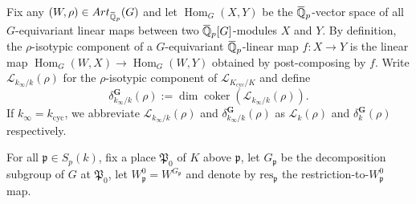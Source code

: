\documentclass[12pt]{amsart}
\newcommand{\Q}{\mathbb{Q}}
\newcommand\gp{\mathfrak{p}}
\newcommand\gP{\mathfrak{P}}
\newcommand\sL{\mathscr{L}}
\newcommand{\ob}[1]{\mkern 1.5mu\overline{\mkern-1.5mu#1\mkern-1.5mu}\mkern 1.5mu}
\newcommand{\res}{\mathrm{res}}
\newcommand{\Art}{\textrm{Art}}
\DeclareMathOperator{\Hom}{Hom}
\DeclareMathOperator{\coker}{coker}
\newcommand{\cyc}{\textrm{cyc}}
\theoremstyle{defstyle}
\theoremstyle{thmstyle}
\begin{document}
	Fix any $(W,\rho)\in \Art_{\ob{\Q}_p}(G)$ and let $\Hom_G(X,Y)$ be the $\ob{\Q}_p$-vector space of all $G$-equivariant linear maps between two $\ob{\Q}_p[G]$-modules $X$ and $Y$. By definition, the $\rho$-isotypic component of a $G$-equivariant $\ob{\Q}_p$-linear map $f:X \to Y$ is the linear map $\Hom_G(W,X) \to \Hom_G(W,Y)$ obtained by post-composing by $f$. Write $\sL_{k_\infty/k}(\rho)$ for the $\rho$-isotypic component of $\sL_{K_{\cyc}/K}$ and define
	\[\delta_{k_\infty/k}^\textbf{G}(\rho) := \dim \coker\left( \sL_{k_\infty/k}(\rho)\right).\]
	If $k_\infty=k_{\cyc}$, we abbreviate $\sL_{k_\infty/k}(\rho)$ and $\delta_{k_\infty/k}^\textbf{G}(\rho)$ as $\sL_k(\rho)$ and $\delta^\textbf{G}_k(\rho)$ respectively.
	
	For all $\gp\in S_p(k)$, fix a place $\gP_0$ of $K$ above $\gp$, let $G_\gp$ be the decomposition subgroup of $G$ at $\gP_0$, let $W_{\gp}^0=W^{G_\gp}$ and denote by $\res_\gp$ the restriction-to-$W_\gp^0$ map.
	
\end{document}
